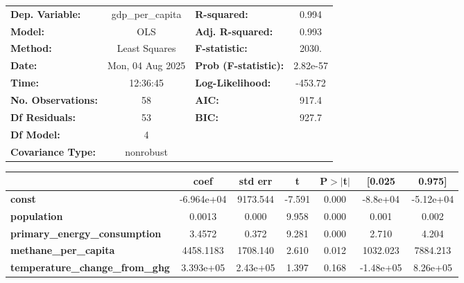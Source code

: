 \begin{center}
\begin{tabular}{lclc}
\toprule
\textbf{Dep. Variable:}                 & gdp\_per\_capita & \textbf{  R-squared:         } &     0.994   \\
\textbf{Model:}                         &       OLS        & \textbf{  Adj. R-squared:    } &     0.993   \\
\textbf{Method:}                        &  Least Squares   & \textbf{  F-statistic:       } &     2030.   \\
\textbf{Date:}                          & Mon, 04 Aug 2025 & \textbf{  Prob (F-statistic):} &  2.82e-57   \\
\textbf{Time:}                          &     12:36:45     & \textbf{  Log-Likelihood:    } &   -453.72   \\
\textbf{No. Observations:}              &          58      & \textbf{  AIC:               } &     917.4   \\
\textbf{Df Residuals:}                  &          53      & \textbf{  BIC:               } &     927.7   \\
\textbf{Df Model:}                      &           4      & \textbf{                     } &             \\
\textbf{Covariance Type:}               &    nonrobust     & \textbf{                     } &             \\
\bottomrule
\end{tabular}
\begin{tabular}{lcccccc}
                                        & \textbf{coef} & \textbf{std err} & \textbf{t} & \textbf{P$> |$t$|$} & \textbf{[0.025} & \textbf{0.975]}  \\
\midrule
\textbf{const}                          &   -6.964e+04  &     9173.544     &    -7.591  &         0.000        &     -8.8e+04    &    -5.12e+04     \\
\textbf{population}                     &       0.0013  &        0.000     &     9.958  &         0.000        &        0.001    &        0.002     \\
\textbf{primary\_energy\_consumption}   &       3.4572  &        0.372     &     9.281  &         0.000        &        2.710    &        4.204     \\
\textbf{methane\_per\_capita}           &    4458.1183  &     1708.140     &     2.610  &         0.012        &     1032.023    &     7884.213     \\
\textbf{temperature\_change\_from\_ghg} &    3.393e+05  &     2.43e+05     &     1.397  &         0.168        &    -1.48e+05    &     8.26e+05     \\

\end{tabular}
\end{center}
